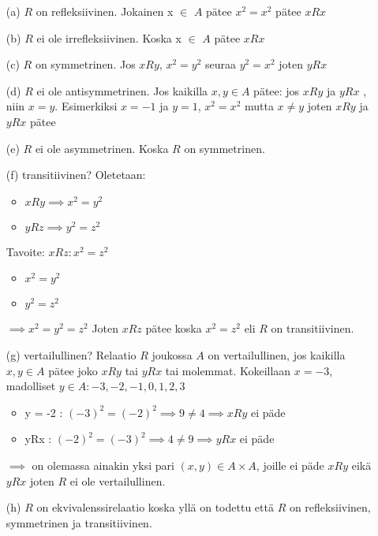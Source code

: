 \documentclass{article}
\begin{document}
    \begin{enumerate}
        \item[(a)] $R$ on refleksiivinen. Jokainen x \(\in\) \(A\) pätee \(x^2 = x^2\) pätee \(xRx\)
        \item[(b)] $R$ ei ole irrefleksiivinen. Koska x \(\in\) \(A\) pätee \(xRx\)
        \item[(c)] $R$ on symmetrinen. Jos \(xRy\), \(x^2 = y^2\) seuraa \(y^2 = x^2\) joten \(yRx\)
        \item[(d)] $R$ ei ole antisymmetrinen. Jos kaikilla \(x, y \in A\) pätee: jos  \(xRy\)  ja  \(yRx\) , niin  \(x = y\).
        Esimerkiksi  \(x = -1\)  ja  \(y = 1\), \(x^2 = x^2\) mutta \(x \neq y\) joten \(xRy\)  ja  \(yRx\) pätee
        \item[(e)] $R$ ei ole asymmetrinen. Koska \(R\) on symmetrinen.
        \item[(f)] transitiivinen?\newline
            Oletetaan:
            \begin{itemize}
                \item $xRy \implies x^2 = y^2$
                \item $yRz \implies y^2 = z^2$
            \end{itemize}
            Tavoite: \(xRz: x^2 = z^2\)
            \begin{itemize}
                \item $x^2 = y^2$
                \item $y^2 = z^2$
            \end{itemize}
            $\implies x^2 = y^2 = z^2$ \newline
            Joten $xRz$ pätee koska $x^2 = z^2$ eli $R$ on transitiivinen.
        \item[(g)] vertailullinen?\newline
        Relaatio  $R$  joukossa  $A$  on vertailullinen, jos kaikilla  $x, y \in A$  pätee joko  $xRy$  tai  $yRx$  tai molemmat.\newline
        Kokeillaan $x = -3$, madolliset  $y \in A :  -3, -2, -1, 0, 1, 2, 3$
        \begin{itemize}
            \item y = -2 : \( (-3)^2 = (-2)^2 \implies 9 \neq 4 \implies xRy \) ei päde
            \item yRx : \( (-2)^2 = (-3)^2 \implies 4 \neq 9 \implies yRx \) ei päde
        \end{itemize}
        $\implies$ on olemassa ainakin yksi pari  $(x, y) \in A \times A $, joille ei päde  $xRy$  eikä  $yRx$ joten $R$ ei ole vertailullinen.
        \item[(h)] $R$ on ekvivalenssirelaatio koska yllä on todettu että $R$ on refleksiivinen, symmetrinen ja transitiivinen.
    \end{enumerate}
    
\end{document}
